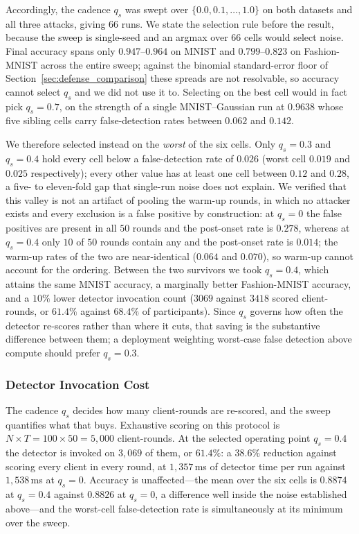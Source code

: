 \documentclass[journal]{IEEEtran}
\begin{document}
Accordingly, the cadence $q_s$ was swept over $\{0.0, 0.1, \dots, 1.0\}$ on both datasets and all three attacks, giving $66$ runs. We state the selection rule before the result, because the sweep is single-seed and an argmax over $66$ cells would select noise. Final accuracy spans only $0.947$--$0.964$ on MNIST and $0.799$--$0.823$ on Fashion-MNIST across the entire sweep; against the binomial standard-error floor of Section~\ref{sec:defense_comparison} these spreads are not resolvable, so accuracy cannot select $q_s$ and we did not use it to. Selecting on the best cell would in fact pick $q_s = 0.7$, on the strength of a single MNIST--Gaussian run at $0.9638$ whose five sibling cells carry false-detection rates between $0.062$ and $0.142$.

We therefore selected instead on the \emph{worst} of the six cells. Only $q_s = 0.3$ and $q_s = 0.4$ hold every cell below a false-detection rate of $0.026$ (worst cell $0.019$ and $0.025$ respectively); every other value has at least one cell between $0.12$ and $0.28$, a five- to eleven-fold gap that single-run noise does not explain. We verified that this valley is not an artifact of pooling the warm-up rounds, in which no attacker exists and every exclusion is a false positive by construction: at $q_s = 0$ the false positives are present in all $50$ rounds and the post-onset rate is $0.278$, whereas at $q_s = 0.4$ only $10$ of $50$ rounds contain any and the post-onset rate is $0.014$; the warm-up rates of the two are near-identical ($0.064$ and $0.070$), so warm-up cannot account for the ordering. Between the two survivors we took $q_s = 0.4$, which attains the same MNIST accuracy, a marginally better Fashion-MNIST accuracy, and a $10\%$ lower detector invocation count ($3069$ against $3418$ scored client-rounds, or $61.4\%$ against $68.4\%$ of participants). Since $q_s$ governs how often the detector re-scores rather than where it cuts, that saving is the substantive difference between them; a deployment weighting worst-case false detection above compute should prefer $q_s = 0.3$.


\subsubsection{Detector Invocation Cost}
\label{sec:invocation_cost}
The cadence $q_s$ decides how many client-rounds are re-scored, and the sweep quantifies what
that buys. Exhaustive scoring on this protocol is $N \times T = 100 \times 50 = 5{,}000$
client-rounds. At the selected operating point $q_s = 0.4$ the detector is invoked on
$3{,}069$ of them, or $61.4\%$: a $38.6\%$ reduction against scoring every client in every
round, at $1{,}357$\,ms of detector time per run against $1{,}538$\,ms at $q_s = 0$. Accuracy
is unaffected---the mean over the six cells is $0.8874$ at $q_s = 0.4$ against $0.8826$ at
$q_s = 0$, a difference well inside the noise established above---and the worst-cell
false-detection rate is simultaneously at its minimum over the sweep.
\end{document}
